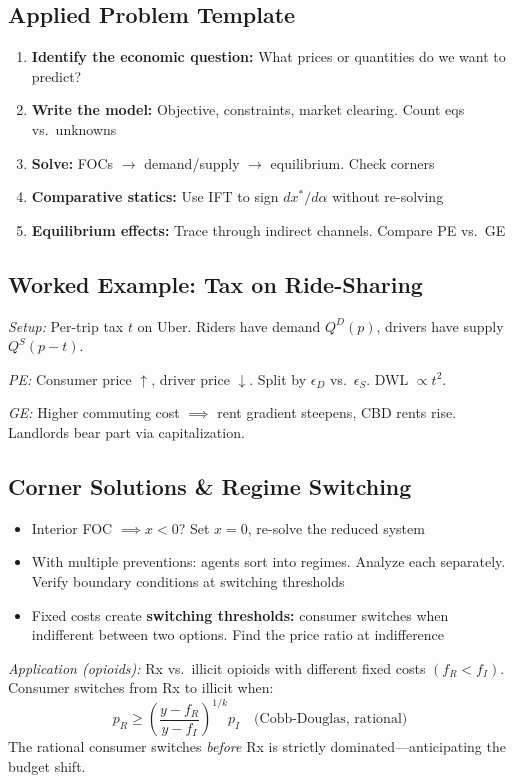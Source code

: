 \subsection{Applied Problem Template}
\begin{enumerate}[nosep]
    \item \textbf{Identify the economic question:} What prices or quantities do we want to predict?
    \item \textbf{Write the model:} Objective, constraints, market clearing. Count eqs vs.\ unknowns
    \item \textbf{Solve:} FOCs $\to$ demand/supply $\to$ equilibrium. Check corners
    \item \textbf{Comparative statics:} Use IFT to sign $dx^*/d\alpha$ without re-solving
    \item \textbf{Equilibrium effects:} Trace through indirect channels. Compare PE vs.\ GE
\end{enumerate}

\subsection{Worked Example: Tax on Ride-Sharing}
\textit{Setup:} Per-trip tax $t$ on Uber. Riders have demand $Q^D(p)$, drivers have supply $Q^S(p - t)$.

\textit{PE:} Consumer price $\uparrow$, driver price $\downarrow$. Split by $\epsilon_D$ vs.\ $\epsilon_S$. DWL $\propto t^2$.

\textit{GE:} Higher commuting cost $\implies$ rent gradient steepens, CBD rents rise. Landlords bear part via capitalization.

\subsection{Corner Solutions \& Regime Switching}
\begin{itemize}[nosep]
    \item Interior FOC $\implies x < 0$? Set $x = 0$, re-solve the reduced system
    \item With multiple preventions: agents sort into regimes. Analyze each separately. Verify boundary conditions at switching thresholds
    \item Fixed costs create \textbf{switching thresholds:} consumer switches when indifferent between two options. Find the price ratio at indifference
\end{itemize}

\textit{Application (opioids):} Rx vs.\ illicit opioids with different fixed costs $(f_R < f_I)$. Consumer switches from Rx to illicit when:
$$p_R \geq \left(\frac{y - f_R}{y - f_I}\right)^{1/k}p_I \quad \text{(Cobb-Douglas, rational)}$$
The rational consumer switches \textit{before} Rx is strictly dominated---anticipating the budget shift.

